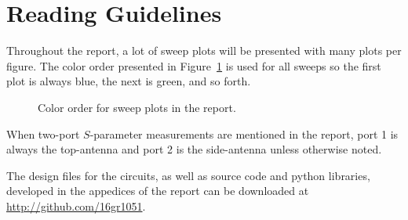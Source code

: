 \section{Reading Guidelines}
Throughout the report, a lot of sweep plots will be presented with many plots per figure. The color order presented in Figure~\ref{fig:colororder} is used for all sweeps so the first plot is always blue, the next is green, and so forth.

\begin{figure}[htbp]
    \centering
    \caption{Color order for sweep plots in the report.}
    \label{fig:colororder}
\end{figure}

When two-port $S$-parameter measurements are mentioned in the report, port 1 is always the top-antenna and port 2 is the side-antenna unless otherwise noted.

The design files for the circuits, as well as source code and python libraries, developed in the appedices of the report can be downloaded at \url{http://github.com/16gr1051}.
